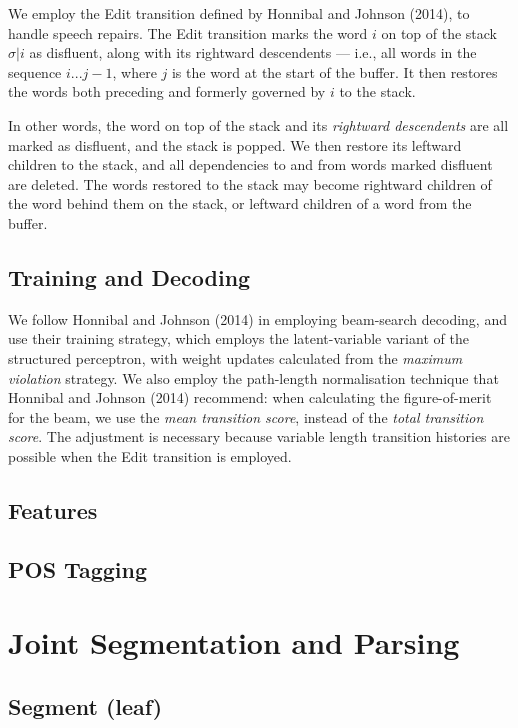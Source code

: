 \documentclass[11pt,letterpaper]{article}
\begin{document}
We employ the Edit transition defined by Honnibal and Johnson (2014), to handle
speech repairs.
The Edit transition marks the word $i$ on top of the stack $\sigma | i$ as
disfluent, along with its rightward descendents --- i.e., all words in the
sequence $i...j-1$, where $j$ is the word at the start of the buffer. It then
restores the words both preceding and formerly governed by $i$ to the stack.

In other words, the word on top of the stack and its \emph{rightward descendents}
are all marked as disfluent, and the stack is popped. We then restore its
leftward children to the stack, and
all dependencies to and from words marked disfluent are deleted. 
The words restored to the stack may
become rightward children of the word behind them on the stack, or leftward
children of a word from the buffer.

\subsection{Training and Decoding}

We follow Honnibal and Johnson (2014) in employing beam-search decoding, and
use their training strategy, which employs the \citet{sun:09} latent-variable
variant of the \citet{collins:02} structured perceptron, with weight updates
calculated from the \citet{huang:12} \emph{maximum violation} strategy.  We
also employ the path-length normalisation technique that Honnibal and Johnson (2014)
recommend: when calculating the figure-of-merit for the beam, we use the
\emph{mean transition score}, instead of the \emph{total transition score}.
The adjustment is necessary because variable length transition histories are
possible when the Edit transition is employed.

\subsection{Features}
\label{sec:features}

\subsection{POS Tagging}

\clearpage

\section{Joint Segmentation and Parsing}

\subsection{Segment (leaf)}
\end{document}
